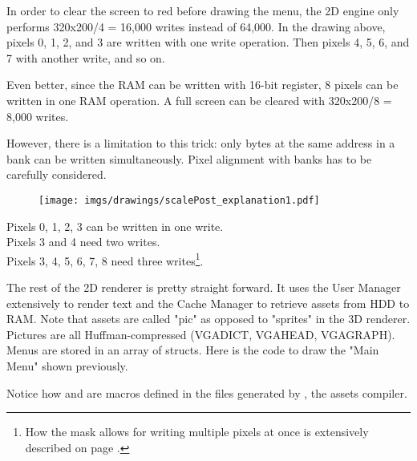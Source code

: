 \par
In order to clear the screen to red before drawing the menu, the 2D engine only performs 320x200/4 = 16,000 writes instead of 64,000. In the drawing above, pixels 0, 1, 2, and 3 are written with one write operation. Then pixels 4, 5, 6, and 7 with another write, and so on.\\
\par
Even better, since the RAM can be written with 16-bit register, 8 pixels can be written in one RAM operation. A full screen can be cleared with 320x200/8 = 8,000 writes.
\par
\begin{minipage}{\textwidth}

\end{minipage}
However, there is a limitation to this trick: only bytes at the same address in a bank can be written simultaneously. Pixel alignment with banks has to be carefully considered.\
\par
\begin{figure}[H]
\centering
 \texttt{[image: imgs/drawings/scalePost\_explanation1.pdf]}
 
 \end{figure}
Pixels 0, 1, 2, 3 can be written in one write.\\
Pixels 3 and 4 need two writes.\\
Pixels 3, 4, 5, 6, 7, 8 need three writes\footnote{How the mask allows for writing multiple pixels at once is extensively described on page \pageref{simd_vga}.}.\\


\par
The rest of the 2D renderer is pretty straight forward. It uses the User Manager extensively to render text and the Cache Manager to retrieve assets from HDD to RAM. Note that assets are called "pic" as opposed to "sprites" in the 3D renderer. Pictures are all Huffman-compressed (VGADICT, VGAHEAD, VGAGRAPH). Menus are stored in an array of structs. Here is the code to draw the "Main Menu" shown previously.\\

\par
\begin{minipage}{\textwidth}

\end{minipage}

\par
\begin{minipage}{\textwidth}

\end{minipage}
\par
Notice how  and  are macros defined in the files generated by , the assets compiler.

